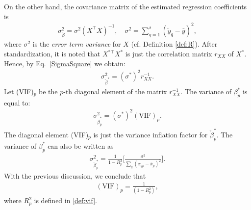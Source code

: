 \begin{remark}
	On the other hand, the covariance matrix of the estimated regression coefficients is
	\begin{align}\label{SigmaSquare}
		\sigma^2_{\check{\beta}} = \sigma^2( X^{\top}  X)^{-1}, \quad
		\sigma^2=\sum_{q=1}^s(\check{y}_q-\bar{y})^2,
	\end{align}
	where $\sigma^2$ is the \emph{error term variance} for $X$ (cf. Definition \ref{def:R}). After standardization, it is noted that $X^{*\top}X^*$ is just the correlation matrix $r_{XX}$ of $X^*$. Hence, by Eq.~\eqref{SigmaSquare} we obtain:	
	\begin{align}
		\sigma^2_{\check{\beta}^\ast} = (\sigma^\ast)^2 r_{XX}^{-1}.
	\end{align}
	Let (VIF)$_p$ be the $p$-th diagonal element of the matrix $r_{XX}^{-1}$. The variance of $\beta_p^\ast$ is equal to: 
	\begin{align}
		\sigma^2_{\check{\beta}_p^*} = (\sigma^*)^2(\text{VIF})_{p}.
	\end{align}
	The diagonal element (VIF)$_p$ is just the variance inflation factor for $\check{\beta}_p^*$. The variance of $\beta_p^*$ can also be written as \cite{Kutner1985}
	\begin{align}
		\sigma^2_{\check{\beta}_p^*}=\frac{1}{1-R_p^2}\Big[ \frac{\sigma^2}{\sum_q(x_{qp}-\bar{x}_p)^2} \Big].
	\end{align}
	With the previous discussion, we conclude that
	\begin{align}
		(\text{VIF})_p = \frac{1}{(1-R_p^2)},
	\end{align}
	where $R_p^2$ is defined in \ref{def:vif}. 
\end{remark}

